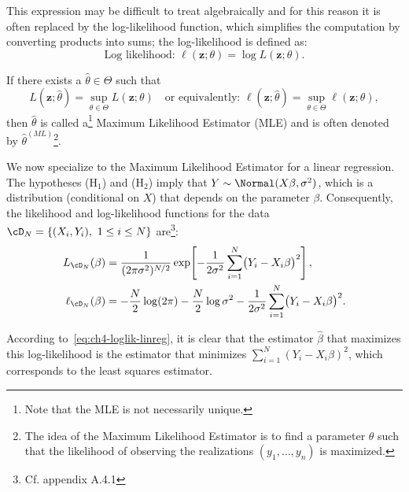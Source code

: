 This expression may be difficult to treat algebraically and for this reason
it is often replaced by the log-likelihood function, which simplifies the computation
by converting products into sums; the log-likelihood is defined as:
\begin{equation}\label{eq:ch4-loglik-def}
\text{Log likelihood: } \ell(\mathbf{z}; \theta) = \log L(\mathbf{z}; \theta).
\end{equation}

\begin{definition}
If there exists a $\widehat{\theta} \in \Theta$ such that
\begin{equation}\label{eq:ch4-mle-def}
L(\mathbf{z}; \widehat{\theta}) = \sup_{\theta \in \Theta} L(\mathbf{z}; \theta) \quad \text{or equivalently: } \ell(\mathbf{z}; \widehat{\theta}) = \sup_{\theta \in \Theta} \ell(\mathbf{z}; \theta),
\end{equation}
then $\widehat{\theta}$ is called a\footnote{Note that the MLE is not necessarily unique.} Maximum Likelihood Estimator (MLE) and is often denoted
by $\widehat{\theta}^{(ML)}$\footnote{The idea of the Maximum Likelihood Estimator is to find a parameter $\theta$ such that the likelihood of observing the realizations $(y_1, \ldots, y_n)$ is maximized.}.
\end{definition}

We now specialize to the Maximum Likelihood Estimator for a linear regression.
The hypotheses (H$_1$) and (H$_2$) imply that $Y \sim \Normal(X\beta, \sigma^2)$, which is a distribution
(conditional on $X$) that depends on the parameter $\beta$. Consequently,
the likelihood and log-likelihood functions for the data $\cD_N = \{(X_i, Y_i),\ 1 \le i \le N\}$
are\footnote{Cf. appendix A.4.1}:
\begin{align}
L_{\cD_N}(\beta) &= \frac{1}{(2\pi \sigma^2)^{N/2}} \exp\!\left[ -\frac{1}{2\sigma^2} \sum_{i=1}^N \bigl(Y_i - X_i \beta\bigr)^2 \right], \nonumber\\
\ell_{\cD_N}(\beta) &= -\frac{N}{2} \log(2\pi) - \frac{N}{2} \log \sigma^2 - \frac{1}{2\sigma^2} \sum_{i=1}^N \bigl(Y_i - X_i \beta\bigr)^2. \label{eq:ch4-loglik-linreg}
\end{align}

According to~\eqref{eq:ch4-loglik-linreg}, it is clear that the estimator $\widehat{\beta}$ that maximizes this log-likelihood
is the estimator that minimizes $\sum_{i=1}^N (Y_i - X_i \beta)^2$, which corresponds
to the least squares estimator.

